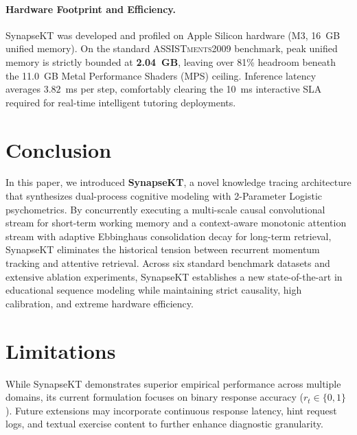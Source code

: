 \documentclass[11pt]{article}
\begin{document}
\paragraph{Hardware Footprint and Efficiency.}
SynapseKT was developed and profiled on Apple Silicon hardware (M3, 16~GB unified memory). On the standard \textsc{ASSISTments2009} benchmark, peak unified memory is strictly bounded at \textbf{2.04~GB}, leaving over 81\% headroom beneath the 11.0~GB Metal Performance Shaders (MPS) ceiling. Inference latency averages $3.82$~ms per step, comfortably clearing the 10~ms interactive SLA required for real-time intelligent tutoring deployments.

\section{Conclusion}
\label{sec:conclusion}

In this paper, we introduced \textbf{SynapseKT}, a novel knowledge tracing architecture that synthesizes dual-process cognitive modeling with 2-Parameter Logistic psychometrics. By concurrently executing a multi-scale causal convolutional stream for short-term working memory and a context-aware monotonic attention stream with adaptive Ebbinghaus consolidation decay for long-term retrieval, SynapseKT eliminates the historical tension between recurrent momentum tracking and attentive retrieval. Across six standard benchmark datasets and extensive ablation experiments, SynapseKT establishes a new state-of-the-art in educational sequence modeling while maintaining strict causality, high calibration, and extreme hardware efficiency.

\section*{Limitations}
While SynapseKT demonstrates superior empirical performance across multiple domains, its current formulation focuses on binary response accuracy ($r_t \in \{0, 1\}$). Future extensions may incorporate continuous response latency, hint request logs, and textual exercise content to further enhance diagnostic granularity.


\end{document}
